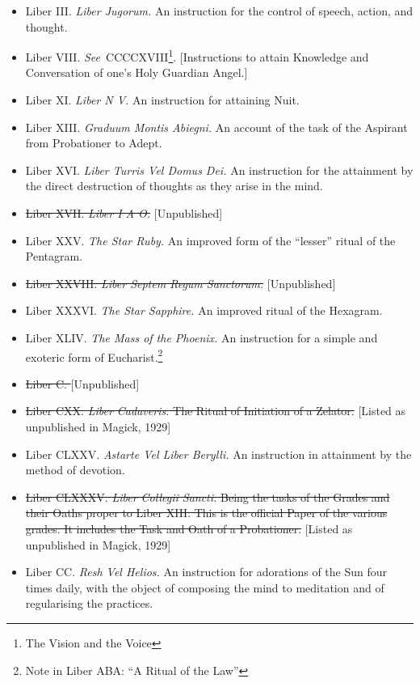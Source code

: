 \begin{itemize}
\item Liber III. \textemdash{} \textit{Liber Jugorum.} An instruction for the control of speech, action, and thought.
\item Liber VIII. \textit{See}{}\-\ CCCCXVIII\footnote{The Vision and the Voice}. [Instructions to attain Knowledge and Conversation of one's Holy Guardian Angel.]
\item Liber XI. \textemdash{} \textit{Liber N V.} An instruction for attaining Nuit.
\item Liber XIII. \textemdash{} \textit{Graduum Montis Abiegni.} An account of the task of the Aspirant from Probationer to Adept.
\item Liber XVI. \textemdash{} \textit{Liber Turris Vel Domus Dei.} An instruction for the attainment by the direct destruction of thoughts as they arise in the mind.
\item \sout{Liber XVII. \textemdash{} \textit{Liber I A O.}} [Unpublished]
\item Liber XXV. \textemdash{} \textit{The Star Ruby.} An improved form of the \enquote{lesser} ritual of the Pentagram.
\item \sout{Liber XXVIII. \textemdash{} \textit{Liber Septem Regum Sanctorum.}} [Unpublished]
\item Liber XXXVI. \textemdash{} \textit{The Star Sapphire.} An improved ritual of the Hexagram.
\item Liber XLIV. \textemdash{} \textit{The Mass of the Phoenix.} An instruction for a simple and exoteric form of Eucharist.\footnote{Note in Liber ABA: \enquote{A Ritual of the Law}}
\item \sout{Liber C. \textemdash{} \textit{}} [Unpublished]
\item \sout{Liber CXX. \textemdash{} \textit{Liber Cadaveris.} The Ritual of Initiation of a Zelator.} [Listed as unpublished in Magick, 1929]
\item Liber CLXXV. \textemdash{} \textit{Astarte Vel Liber Berylli.} An instruction in attainment by the method of devotion.
\item \sout{Liber CLXXXV. \textemdash{} \textit{Liber Collegii Sancti.} Being the tasks of the Grades and their Oaths proper to Liber XIII. This is the official Paper of the various grades. It includes the Task and Oath of a Probationer.} [Listed as unpublished in Magick, 1929]
\item Liber CC. \textemdash{} \textit{Resh Vel Helios.} An instruction for adorations of the Sun four times daily, with the object of composing the mind to meditation and of regularising the practices.

\end{itemize}
